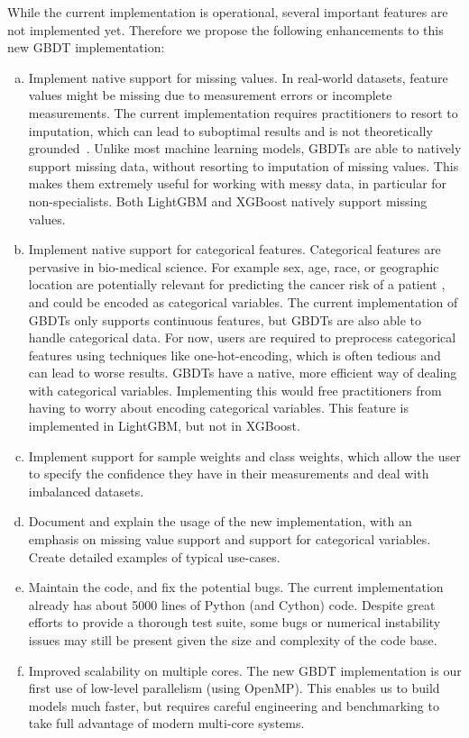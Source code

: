 \documentclass[11pt]{article}  %
\begin{document}
While the current implementation is operational,
several important features are not implemented yet. Therefore we propose the following enhancements to this new GBDT implementation:
\begin{enumerate}[a)]
\item Implement native support for missing values. In real-world datasets, feature values might be missing due to measurement errors or incomplete measurements. The current implementation requires practitioners to resort to
imputation, which can lead to suboptimal results and is not theoretically grounded~\cite{missing_values_consistency}.
Unlike most machine learning models, GBDTs are able to natively support
missing data, without resorting to imputation of missing values. This makes
them extremely useful for working with messy data, in particular for non-specialists. Both
LightGBM and XGBoost natively support missing values.
\item Implement native support for categorical features. Categorical
features are pervasive in bio-medical science. For example sex, age, race,
or geographic location are potentially relevant
for predicting the cancer risk of a patient \cite{RICHTER201929}, and could be encoded as categorical variables. The current
implementation of GBDTs only supports continuous features, but GBDTs are
also able to handle categorical data. For now, users are required to
preprocess categorical features using techniques like one-hot-encoding, which
is often tedious and can lead to worse results. GBDTs have a native, more efficient way of dealing with categorical variables. 
Implementing this would free practitioners from having to worry about encoding categorical variables.
This feature is implemented in LightGBM, but not in XGBoost.
\item Implement support for sample weights and class weights, which allow the user to specify the confidence they have in their measurements and deal with imbalanced datasets.
\item Document and explain the usage of the new implementation, with an emphasis on missing value support and support for categorical variables. Create detailed examples of typical use-cases.
\item Maintain the code, and fix the potential bugs. The current
implementation already has about 5000 lines of Python (and Cython) code.
Despite great efforts to provide a thorough test suite, some bugs or
numerical instability issues may still be present given the size and complexity of the
code base.

\item Improved scalability on multiple cores. The new GBDT implementation is our first use of low-level
parallelism (using OpenMP). This enables us to build models much faster, but requires careful engineering and benchmarking to take full advantage of modern multi-core systems.
\end{enumerate}
\end{document}
